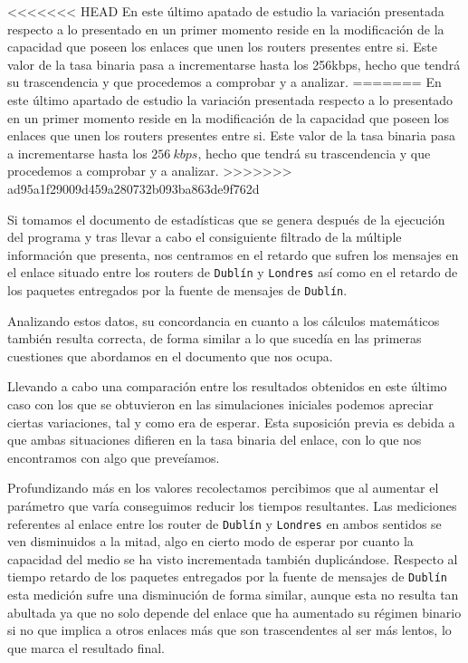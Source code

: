 \documentclass{article}[10pt]
\begin{document}
<<<<<<< HEAD
		En este último apatado de estudio la variación presentada respecto a lo presentado en un primer momento reside en la modificación de la capacidad que poseen los enlaces que unen los routers presentes entre si. Este valor de la tasa binaria pasa a incrementarse hasta los 256kbps, hecho que tendrá su trascendencia y que procedemos a comprobar y a analizar.
=======
		En este último apartado de estudio la variación presentada respecto a lo presentado en un primer momento reside en la modificación de la capacidad que poseen los enlaces que unen los routers presentes entre si. Este valor de la tasa binaria pasa a incrementarse hasta los $256\ kbps$, hecho que tendrá su trascendencia y que procedemos a comprobar y a analizar.
>>>>>>> ad95a1f29009d459a280732b093ba863de9f762d

		Si tomamos el documento de estadísticas que se genera después de la ejecución del programa y tras llevar a cabo el consiguiente filtrado de la múltiple información que presenta, nos centramos en el retardo que sufren los mensajes en el enlace situado entre los routers de \texttt{Dublín} y \texttt{Londres} así como en el retardo de los paquetes entregados por la fuente de mensajes de \texttt{Dublín}.

		Analizando estos datos, su concordancia en cuanto a los cálculos matemáticos también resulta correcta, de forma similar a lo que sucedía en las primeras cuestiones que abordamos en el documento que nos ocupa.

		Llevando a cabo una comparación entre los resultados obtenidos en este último caso con los que se obtuvieron en las simulaciones iniciales podemos apreciar ciertas variaciones, tal y como era de esperar. Esta suposición previa es debida a que ambas situaciones difieren en la tasa binaria del enlace, con lo que nos encontramos con algo que preveíamos.

		Profundizando más en los valores recolectamos percibimos que al aumentar el parámetro que varía conseguimos reducir los tiempos resultantes. Las mediciones referentes al enlace entre los router de \texttt{Dublín} y \texttt{Londres} en ambos sentidos se ven disminuidos a la mitad, algo en cierto modo de esperar por cuanto la capacidad del medio se ha visto incrementada también duplicándose. Respecto al tiempo retardo de los paquetes entregados por la fuente de mensajes de \texttt{Dublín} esta medición sufre una disminución de forma similar, aunque esta no resulta tan abultada ya que no solo depende del enlace que ha aumentado su régimen binario si no que implica a otros enlaces más que son trascendentes al ser más lentos, lo que marca el resultado final.
\end{document}
